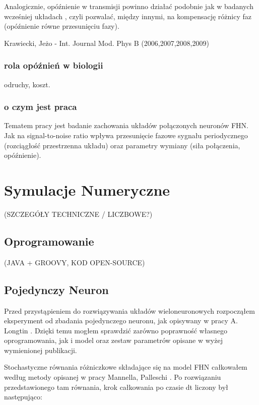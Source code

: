 \documentclass[12pt]{article}
\begin{document}
  Analogicznie, opóźnienie w transmisji powinno działać podobnie jak w badanych wcześniej układach \cite{ijmpb_23_2}, czyli pozwalać, między innymi, na kompensację różnicy faz (opóźnienie równe przesunięciu fazy).

  Krawiecki, Jeżo - Int. Journal Mod. Phys B (2006,2007,2008,2009)

  \subsubsection{rola opóźnień w biologii}
  odruchy, koszt.
  
  \subsubsection{o czym jest praca}

  Tematem pracy jest badanie zachowania układów połączonych neuronów FHN. Jak na signal-to-noise ratio wpływa przesunięcie fazowe sygnału periodycznego (rozciągłość przestrzenna układu) oraz parametry wymiany (siła połączenia, opóźnienie).

    
  \section{Symulacje Numeryczne}
  
  (SZCZEGÓŁY TECHNICZNE / LICZBOWE?)
  
  
  \subsection{Oprogramowanie}
  
  (JAVA + GROOVY, KOD OPEN-SOURCE)
  
  \subsection{Pojedynczy Neuron}
  
  Przed przystąpieniem do rozwiązywania układów wieloneuronowych rozpocząłem eksperyment od zbadania pojedynczego neuronu, jak opisywany w pracy A. Longtin \cite{longtin}. Dzięki temu mogłem sprawdzić zarówno poprawność własnego oprogramowania, jak i model oraz zestaw parametrów opisane w wyżej wymienionej publikacji.
  
  Stochastyczne równania różniczkowe składające się na model FHN całkowałem według metody opisanej w pracy Mannella, Palleschi \cite{mannella}. Po rozwiązaniu przedstawionego tam równania, krok całkowania po czasie dt liczony był następująco:
  
\end{document}
